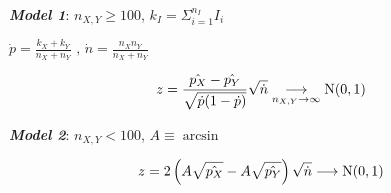 \vspace{10pt}
\textbf{\em Model 1}:
$n_{X,Y}\geq100$, $ k_I = \Sigma_{i=1}^{n_I} I_i $

$ \dot{p}=\frac{k_X+k_Y}{n_X+n_Y} \mbox{ , } \dot{n}=\frac{n_X n_Y}{n_X+n_Y} $

\vspace{-15pt}
\begin{gather*}
z=\frac{\hat{p_X}-\hat{p_Y}}{\sqrt{\dot{p}(1-\dot{p})}}\sqrt{\dot{n}}
\underset{n_{X,Y} \rightarrow \infty}{\longrightarrow} \textrm{N}(0,1)
\end{gather*}

\textbf{\em Model 2}:
$n_{X,Y}<100$, $A \equiv \arcsin$

\vspace{-15pt}
\begin{gather*}
z=2\left(A{\sqrt{\hat{p_X}}}-A{\sqrt{\hat{p_Y}}} \right)\sqrt{\dot{n}}
\longrightarrow \textrm{N}(0,1)
\end{gather*}

\vfill
